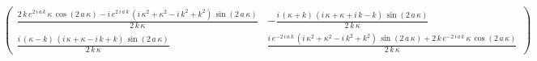 \[
\begin{pmatrix}
\frac{2\,k\,e^{2\,i\,a\,k}\,\kappa\,\cos \left(2\,a\,\kappa
 \right)-i\,e^{2\,i\,a\,k}\,\left(i\,\kappa^2+\kappa^2-i\,k^2+k^2
 \right)\,\sin \left(2\,a\,\kappa\right)}{2\,k\,\kappa}
&
-\frac{i\,
 \left(\kappa+k\right)\,\left(i\,\kappa+\kappa+i\,k-k\right)\,\sin 
 \left(2\,a\,\kappa\right)}{2\,k\,\kappa}
\\
\frac{i\,\left(\kappa-
 k\right)\,\left(i\,\kappa+\kappa-i\,k+k\right)\,\sin \left(2\,a\,
 \kappa\right)}{2\,k\,\kappa}
&
\frac{i\,e^ {- 2\,i\,a\,k }\,\left(i
 \,\kappa^2+\kappa^2-i\,k^2+k^2\right)\,\sin \left(2\,a\,\kappa
 \right)+2\,k\,e^ {- 2\,i\,a\,k }\,\kappa\,\cos \left(2\,a\,\kappa
 \right)}{2\,k\,\kappa}
\end{pmatrix}
\]
